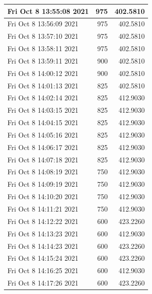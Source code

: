 \begin{longtable}{|l|r|r|}
Fri Oct  8 13:55:08 2021 &                975 &        402.5810 \\ \hline
Fri Oct  8 13:56:09 2021 &                975 &        402.5810 \\ \hline
Fri Oct  8 13:57:10 2021 &                975 &        402.5810 \\ \hline
Fri Oct  8 13:58:11 2021 &                975 &        402.5810 \\ \hline
Fri Oct  8 13:59:11 2021 &                900 &        402.5810 \\ \hline
Fri Oct  8 14:00:12 2021 &                900 &        402.5810 \\ \hline
Fri Oct  8 14:01:13 2021 &                825 &        402.5810 \\ \hline
Fri Oct  8 14:02:14 2021 &                825 &        412.9030 \\ \hline
Fri Oct  8 14:03:15 2021 &                825 &        412.9030 \\ \hline
Fri Oct  8 14:04:15 2021 &                825 &        412.9030 \\ \hline
Fri Oct  8 14:05:16 2021 &                825 &        412.9030 \\ \hline
Fri Oct  8 14:06:17 2021 &                825 &        412.9030 \\ \hline
Fri Oct  8 14:07:18 2021 &                825 &        412.9030 \\ \hline
Fri Oct  8 14:08:19 2021 &                750 &        412.9030 \\ \hline
Fri Oct  8 14:09:19 2021 &                750 &        412.9030 \\ \hline
Fri Oct  8 14:10:20 2021 &                750 &        412.9030 \\ \hline
Fri Oct  8 14:11:21 2021 &                750 &        412.9030 \\ \hline
Fri Oct  8 14:12:22 2021 &                600 &        423.2260 \\ \hline
Fri Oct  8 14:13:23 2021 &                600 &        412.9030 \\ \hline
Fri Oct  8 14:14:23 2021 &                600 &        423.2260 \\ \hline
Fri Oct  8 14:15:24 2021 &                600 &        423.2260 \\ \hline
Fri Oct  8 14:16:25 2021 &                600 &        412.9030 \\ \hline
Fri Oct  8 14:17:26 2021 &                600 &        423.2260 \\ \hline

\end{longtable}
